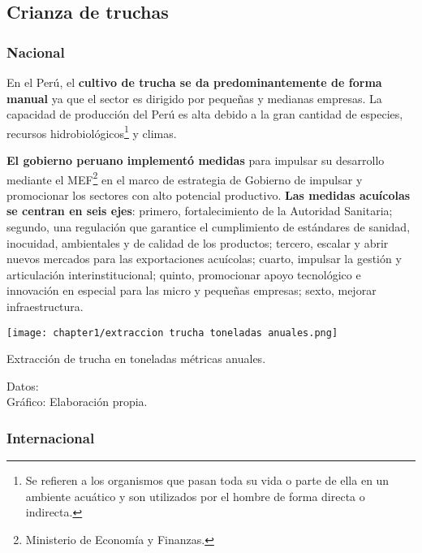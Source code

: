 \subsection{Crianza de truchas}

\subsubsection{Nacional}
En el Perú, el \textbf{cultivo de trucha se da predominantemente de forma manual} ya que el sector es dirigido por pequeñas y medianas empresas. La capacidad de producción del Perú es alta debido a la gran cantidad de especies, recursos hidrobiológicos\footnote{Se refieren a los organismos que pasan toda su vida o parte de ella en un ambiente acuático y son utilizados por el hombre de forma directa o indirecta.\citep{MINAGRI2011}} y climas.

\textbf{El gobierno peruano implementó medidas} para impulsar su desarrollo mediante el MEF\footnote{Ministerio de Economía y Finanzas.}  en el marco de estrategia de Gobierno de impulsar y promocionar los sectores con alto potencial productivo. \textbf{Las medidas acuícolas se centran en seis ejes}: primero, fortalecimiento de la Autoridad Sanitaria; segundo, una regulación que garantice el cumplimiento de estándares de sanidad, inocuidad, ambientales y de calidad de los productos; tercero, escalar y abrir nuevos mercados para las exportaciones acuícolas; cuarto, impulsar la gestión y articulación interinstitucional; quinto, promocionar apoyo tecnológico e innovación en especial para las micro y pequeñas empresas; sexto, mejorar infraestructura. \citep{Andina2019}

\begin{myfigure}[H]
	\footnotesize\centering
	\texttt{[image: chapter1/extraccion trucha toneladas anuales.png]}
	\caption{Extracción de trucha en toneladas métricas anuales.}
	\begin{myflushcenter}
		Datos: \citep{MinisteriodelaProducciondelPeru2018} 	 \\ 
		Gráfico: Elaboración propia.
	\end{myflushcenter}	
	\label{fig:Extracción de trucha en toneladas métricas anuales}
\end{myfigure}

\subsubsection{Internacional}

